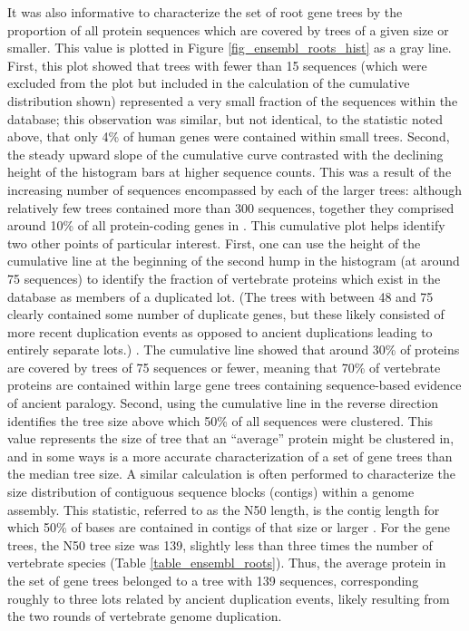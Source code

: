 It was also informative to characterize the set of root \cmp gene trees by
the proportion of all protein sequences which are covered by trees of
a given size or smaller. This value is plotted in Figure
\ref{fig_ensembl_roots_hist} as a gray line. First, this plot showed
that trees with fewer than 15 sequences (which were excluded from the
plot but included in the calculation of the cumulative distribution
shown) represented a very small fraction of the sequences within the
\cmp database; this observation was similar, but not identical, to the
statistic noted above, that only 4\% of human genes were contained
within small trees. Second, the steady upward slope of the cumulative
curve contrasted with the declining height of the histogram bars at
higher sequence counts. This was a result of the increasing number of
sequences encompassed by each of the larger trees: although relatively
few trees contained more than 300 sequences, together they comprised
around 10\% of all protein-coding genes in \cmp. This cumulative plot
helps identify two other points of particular interest. First, one can
use the height of the cumulative line at the beginning of the second
hump in the histogram (at around 75 sequences) to identify the
fraction of vertebrate proteins which exist in the \cmp database as
members of a duplicated \mammln \ac{lot}. (The trees with between 48
and 75 clearly contained some number of duplicate genes, but these
likely consisted of more recent duplication events as opposed to
ancient duplications leading to entirely separate \acp{lot}.) . The
cumulative line showed that around 30\% of proteins are covered by
trees of 75 sequences or fewer, meaning that 70\% of vertebrate
proteins are contained within large gene trees containing
sequence-based evidence of ancient paralogy. Second, using the
cumulative line in the reverse direction identifies the tree size
above which 50\% of all sequences were clustered. This value
represents the size of tree that an ``average'' protein might be
clustered in, and in some ways is a more accurate characterization of
a set of gene trees than the median tree size. A similar calculation
is often performed to characterize the size distribution of contiguous
sequence blocks (contigs) within a genome assembly. This statistic,
referred to as the N50 length, is the contig length for which 50\% of
bases are contained in contigs of that size or larger
\citep{Miller2010}. For the \cmp gene trees, the N50 tree size was
139, slightly less than three times the number of vertebrate species
(Table \ref{table_ensembl_roots}). Thus, the average protein in the
set of \cmp gene trees belonged to a tree with 139 sequences,
corresponding roughly to three \mammln \acp{lot} related by ancient
duplication events, likely resulting from the two rounds of vertebrate
genome duplication.

